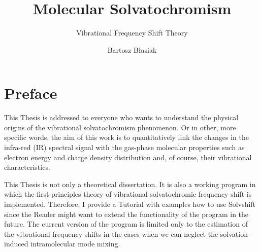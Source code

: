 \documentclass[a4paper,titlepage,twoside,fleqn,12pt]{book}
\title{Molecular Solvatochromism}
\subtitle{Vibrational Frequency Shift Theory}
\author{Bartosz B{\l}asiak}
\begin{document}
\graphicspath{{figures/}}
\maketitle
\tableofcontents

\chapter*{Preface}

This Thesis is addressed to everyone who wants to understand the physical
origins of the vibrational solvatochromism phenomenon. Or in other, more specific words, 
the aim of this work is to quantitatively link the changes in the infra-red (IR)
spectral signal with the gas-phase molecular properties such as electron energy and charge
density distribution and, of course, their vibrational characteristics. 

This Thesis is not only a theoretical dissertation. It is also a working program 
in which the first-principles theory of vibrational solvatochromic frequency shift is 
implemented. Therefore, I provide a Tutorial with examples how to use {\sc Solvshift} 
since the Reader might want to extend the functionality of the program in the future.
The current version of the program is limited only to the estimation of the vibrational frequency 
shifts in the cases when we can neglect the solvation-induced intramolecular mode mixing.

\end{document}

